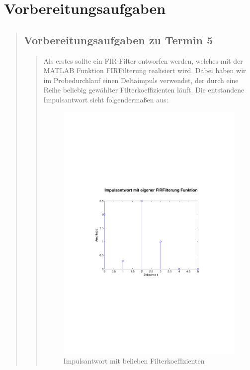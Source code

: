 \section{Vorbereitungsaufgaben}
\begin{quote}
    
    \subsection{Vorbereitungsaufgaben zu Termin 5}
    \begin{quote}
    
	Als erstes sollte ein FIR-Filter entworfen werden, welches mit der MATLAB
	Funktion FIRFilterung realisiert wird. Dabei haben wir im Probedurchlauf einen
	Deltaimpuls verwendet, der durch eine Reihe beliebig gewählter
	Filterkoeffizienten läuft. Die entstandene Impulsantwort sieht folgendermaßen
	aus:
	
	\begin{figure}[H]
            \centering
                \includegraphics[scale=0.5, trim = 1cm 6cm 1.5cm 8cm,
                clip]{./Bilder/Impulsantwort_aufgabe1}
                    \caption{Impulsantwort mit belieben Filterkoeffizienten}
                    \label{fig:./Bilder/Impulsantwort_aufgabe1}
            \end{figure}
            

\end{quote}
\end{quote}
